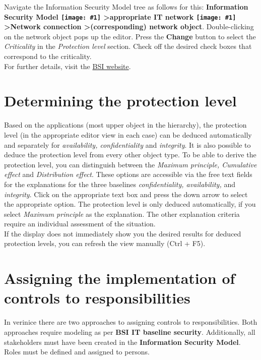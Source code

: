 \documentclass[a4paper,10pt]{book}
\newcommand{\icon}[1]{\texttt{[image: \#1]}}
\begin{document}
Navigate the Information Security Model tree as follows for this:
\textbf{Information Security Model
\icon{Icon/GS_Modell.png} \textgreater appropriate IT network
\icon{Icon/GS_Modell.png}
\textgreater Network connection \textgreater (corresponding) network object}.
Double-clicking on the network object pops up the editor. Press the \textbf{Change} button to select the
{\em Criticality} in the {\em Protection level} section. Check off the desired check boxes that correspond to the criticality.
\newline\\
For further details, visit the \href{https://www.bsi.bund.de/cln_156/ContentBSI/grundschutz/webkurs/gskurs/seiten/s4000_htm.html}{BSI website}.

\section{Determining the protection level}
Based on the applications (most upper object in the hierarchy), the protection level (in the appropriate editor view in each case) can be deduced
automatically and separately for {\em availability, confidentiality} and {\em integrity}. It is also possible to deduce the protection level from
every other object type. To be able to derive the protection level, you can distinguish between the {\em Maximum principle, Cumulative effect} and
{\em Distribution effect}. These options are accessible via the free text fields for the explanations for the three baselines
{\em confidentiality, availability,} and {\em integrity}. Click on the appropriate text box and press the down arrow to select
the appropriate option. The protection level is only deduced automatically, if you select {\em Maximum principle}
as the explanation. The other explanation criteria require an individual assessment of the situation.
\newline\\
If the display does not immediately show you the desired results for deduced protection levels, you can refresh the view
manually (Ctrl + F5).

\section{Assigning the implementation of controls to responsibilities}
In verinice there are two approaches to assigning controls to responsibilities.
Both approaches require modeling as per \textbf{BSI IT baseline security}. Additionally, all stakeholders must have been created in the
\textbf{Information Security Model}. Roles must be defined and assigned to persons.
\end{document}
